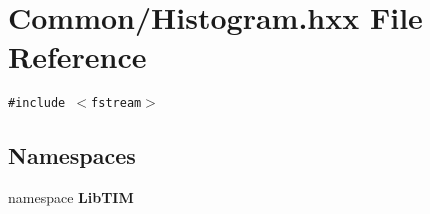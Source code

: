 \section{Common/Histogram.hxx File Reference}
\label{Histogram_8hxx}
{\tt \#include $<$fstream$>$}\par
\subsection*{Namespaces}
\begin{CompactItemize}
\item 
namespace {\bf Lib\-TIM}
\end{CompactItemize}
